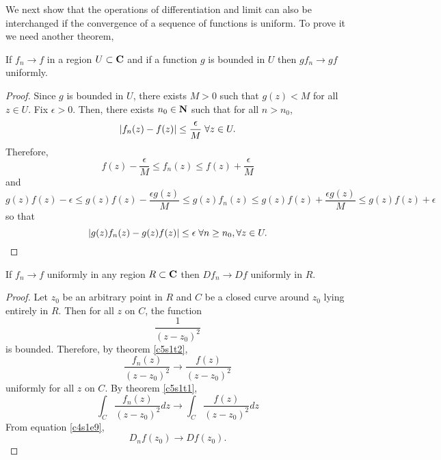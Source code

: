 We next show that the operations of differentiation and limit can also be
interchanged if the convergence of a sequence of functions is uniform. To 
prove it we need another theorem,
\begin{thm}\label{c5s1t2}
If $f_n \rightarrow f$ in a region $U \subset \mathbf{C}$ and if a function $g$ is
bounded in $U$ then $gf_n \rightarrow gf$ uniformly.
\end{thm}
\begin{proof}
Since $g$ is bounded in $U$, there exists $M > 0$ such that $g(z) < M$ for all
$z \in U$. Fix $\epsilon > 0$. Then, there exists $n_0 \in \mathbf{N}$ such that
for all $n > n_0$,
\[
\left\vert{f_n(z) - f(z)}\right\vert \le \frac{\epsilon}{M} \;\forall z \in U.
\]
Therefore,
\[
f(z) - \frac{\epsilon}{M} \le f_n(z) \le f(z) + \frac{\epsilon}{M}
\]
and 
\[
g(z)f(z) - \epsilon \le g(z)f(z) - \frac{\epsilon g(z)}{M} \le g(z)f_n(z) \le
g(z)f(z) + \frac{\epsilon g(z)}{M} \le g(z)f(z) + \epsilon
\]
so that
\[
\left\vert{g(z)f_n(z) - g(z)f(z)}\right\vert \le \epsilon \;\forall n \ge n_0, \forall z \in U.
\]
\end{proof}

\begin{thm}[Weierstrass]\label{c5s1t3}
If $f_n \rightarrow f$ uniformly in any region $R \subset \mathbf{C}$ then $Df_n 
\rightarrow Df$ uniformly in $R$.
\end{thm}
\begin{proof}
Let $z_0$ be an arbitrary point in $R$ and $C$ be a closed curve around
$z_0$ lying entirely in $R$. Then for all $z$ on $C$, the function
\[
\frac{1}{(z - z_0)^2}
\]
is bounded. Therefore, by theorem \ref{c5s1t2},
\[
\frac{f_n(z)}{(z - z_0)^2} \rightarrow \frac{f(z)}{(z - z_0)^2}
\]
uniformly for all $z$ on $C$. By theorem \ref{c5s1t1},
\[
\int_C \frac{f_n(z)}{(z - z_0)^2} dz \rightarrow 
\int_C \frac{f(z)}{(z - z_0)^2} dz
\]
From equation \eqref{c4s1e9},
\[
D_n f(z_0) \rightarrow Df(z_0).
\]
\end{proof}

